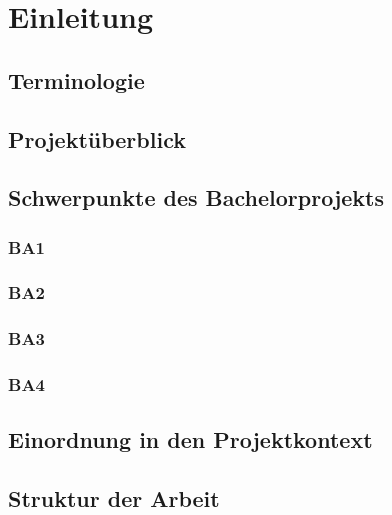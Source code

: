 
\chapter{Einleitung}

\section{Terminologie}

\section{Projektüberblick}

\section{Schwerpunkte des Bachelorprojekts}

\subsection{BA1}

\subsection{BA2}

\subsection{BA3}

\subsection{BA4}

\section{Einordnung in den Projektkontext} %

\section{Struktur der Arbeit}